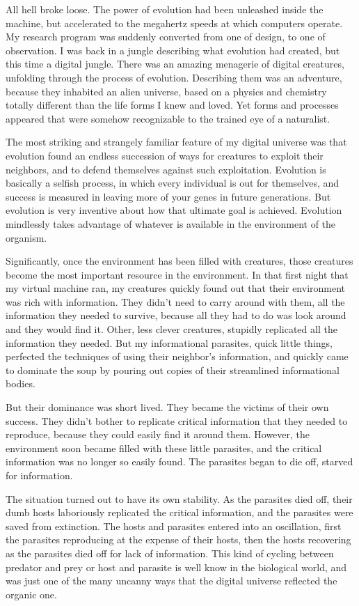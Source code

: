 All hell broke loose.  The power of evolution had been unleashed inside the
machine, but accelerated to the megahertz speeds at which computers operate.
My research program was suddenly converted from one of design, to one of
observation.  I was back in a jungle describing what evolution had created,
but this time a digital jungle.  There was an amazing menagerie of digital
creatures, unfolding through the process of evolution.  Describing them
was an adventure, because they inhabited an alien universe, based on a
physics and chemistry totally different than the life forms I knew and
loved.  Yet forms and processes appeared that were somehow recognizable to
the trained eye of a naturalist.

The most striking and strangely familiar feature of my digital universe was
that evolution found an endless succession of ways for creatures to exploit
their neighbors, and to defend themselves against such exploitation.  Evolution
is basically a selfish process, in which every individual is out for
themselves, and success is measured in leaving more of your genes in future
generations.  But evolution is very inventive about how that ultimate goal
is achieved.  Evolution mindlessly takes advantage of whatever is available
in the environment of the organism.

Significantly, once the environment has been filled with creatures, those
creatures become the most important resource in the environment.  In that
first night that my virtual machine ran, my creatures quickly found out
that their environment was rich with information.  They didn't need to
carry around with them, all the information they needed to survive, because
all they had to do was look around and they would find it.  Other, less
clever creatures, stupidly replicated all the information they needed.
But my informational parasites, quick little things, perfected the techniques
of using their neighbor's information, and quickly came to dominate the
soup by pouring out copies of their streamlined informational bodies.

But their dominance was short lived.  They became the victims of their own
success.  They didn't bother to replicate critical information that they
needed to reproduce, because they could easily find it around them.  However,
the environment soon became filled with these little parasites, and the
critical information was no longer so easily found.  The parasites began
to die off, starved for information.

The situation turned out to have its own stability.  As the parasites died
off, their dumb hosts laboriously replicated the critical information, and
the parasites were saved from extinction.  The hosts and parasites
entered into an oscillation, first the parasites reproducing at the expense
of their hosts, then the hosts recovering as the parasites died off for
lack of information.  This kind of cycling between predator and prey or
host and parasite is well know in the biological world, and was just one
of the many uncanny ways that the digital universe reflected the organic
one.

